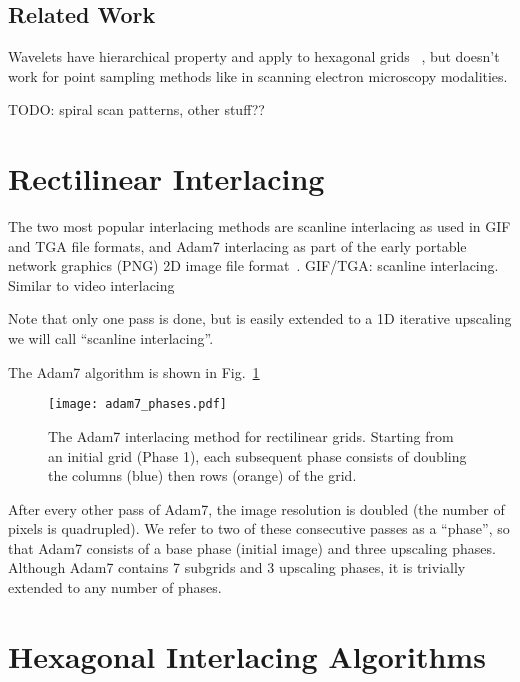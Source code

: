 \documentclass{article}
\newcommand{\reffig}[1]{Fig.~\ref{fig:#1}}
\begin{document}
\subsection{Related Work}
\label{sec:wavelets}

Wavelets have hierarchical property and apply to hexagonal grids~ \cite{jeevan2014compression}
, but doesn't work for point sampling methods
like in scanning electron microscopy modalities.

TODO: spiral scan patterns, other stuff??


\section{Rectilinear Interlacing}
\label{sec:rect}

The two most popular interlacing methods are scanline interlacing as used in GIF and TGA file formats, and Adam7 interlacing as part of the early portable network graphics (PNG) 2D image file format~\citep{rfc2083}.
%
GIF/TGA: scanline interlacing. Similar to video interlacing

%
Note that only one pass is done, but is easily extended to a 1D iterative upscaling we will call ``scanline interlacing''.


The Adam7 algorithm is shown in \reffig{adam7phases}


\begin{figure}[ht]
\centering
\texttt{[image: adam7\_phases.pdf]}
\caption{\label{fig:adam7phases}
The Adam7 interlacing method for rectilinear grids.
%
	Starting from an initial grid (Phase 1), each subsequent phase consists of doubling the columns (blue) then rows (orange) of the grid.
	}
\end{figure}


After every other pass of Adam7, the image resolution is doubled (the number of pixels is quadrupled).
%
We refer to two of these consecutive passes as a ``phase'', so that Adam7 consists of a base phase (initial image) and three upscaling phases.
%
Although Adam7 contains 7 subgrids and 3 upscaling phases, it is trivially extended to any number of phases.


\section{Hexagonal Interlacing Algorithms}
\label{sec:hexinter}
\end{document}
